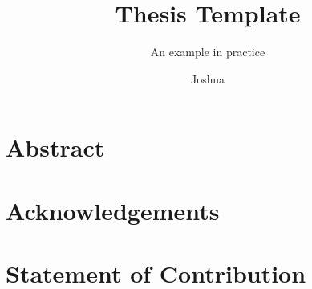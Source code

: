 \documentclass[11pt, twoside, openright, final]{thesis}
\title{\texorpdfstring{%
    Thesis Template%
  }{%
    Thesis Template%
  }}
\subtitle{An example in practice}
\author{Joshua}{Ellis}
\makeatletter
\renewcommand*\maketitle{\thesis@maketitle}
\makeatother
\begin{document}

\maketitle

\cleardoublepage
{}


\clearpage
\section*{Abstract}

\lipsum[1]


\section*{Acknowledgements}

\lipsum[3]


\section*{Statement of Contribution}

\lipsum[10]

\cleardoublepage

\tableofcontents

\cleardoublepage
{}





\appendix


\cleardoublepage
\pagestyle{plain}
\twocolumn
\printbibliography

\cleardoublepage
\printindex
\end{document}
